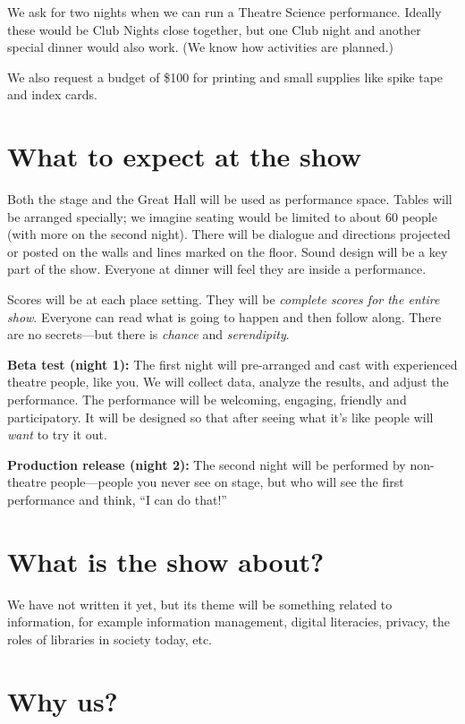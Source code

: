 \documentclass[12pt]{article}
\begin{document}
We ask for two nights when we can run a Theatre Science performance.  Ideally these would be Club Nights close together, but one Club night and another special dinner would also work.  (We know how activities are planned.)

We also request a budget of \$100 for printing and small supplies like spike tape and index cards.

\section{What to expect at the show}

Both the stage and the Great Hall will be used as performance space.  Tables will be arranged specially; we imagine seating would be limited to about 60 people (with more on the second night).  There will be dialogue and directions projected or posted on the walls and lines marked on the floor.  Sound design will be a key part of the show.  Everyone at dinner will feel they are inside a performance.

Scores will be at each place setting.  They will be \textit{complete scores for the entire show}.  Everyone can read what is going to happen and then follow along.  There are no secrets---but there is \textit{chance} and \textit{serendipity}.

\textbf{Beta test (night 1):}  The first night will pre-arranged and cast with experienced theatre people, like you.  We will collect data, analyze the results, and adjust the performance.  The performance will be welcoming, engaging, friendly and participatory.  It will be designed so that after seeing what it's like people will \textit{want} to try it out.

\textbf{Production release (night 2):} The second night will be performed by non-theatre people---people you never see on stage, but who will see the first performance and think, ``I can do that!''

\section{What is the show about?}

We have not written it yet, but its theme will be something related to information, for example information management, digital literacies, privacy, the roles of libraries in society today, etc.

\section{Why us?}
\end{document}
